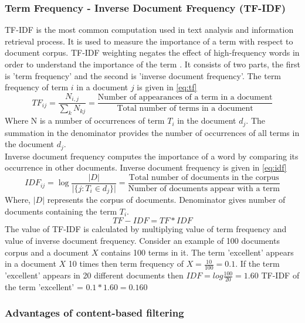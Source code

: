 \subsubsection{Term Frequency - Inverse Document Frequency (TF-IDF)}
TF-IDF is the most common computation used in text analysis and information retrieval process. It is used to measure the importance of a term with respect to document corpus. TF-IDF weighting negates the effect of high-frequency words in order to understand the importance of the term \cite{47}. It consists of two parts, the first is 'term frequency' and the second is 'inverse document frequency'.  The term frequency of term $i$ in a document $j$ is given in \autoref{eq:tf}
\begin{equation}
TF_{ij} = \frac{N_{i,j}}{\sum_{k} N_{kj}} = \frac{\textrm{Number of appearances of a term in a document}}{\textrm{Total number of terms in a document}}
\label{eq:tf}
\end{equation}
\noindent Where N is a number of occurrences of term $T_{i}$ in the document $d_j$. The summation in the denominator provides the number of occurrences of all terms in the document $d_j$. 
\\
\noindent Inverse document frequency computes the importance of a word by comparing its occurrence in other documents. Inverse document frequency is given in \autoref{eq:idf} 
\begin{equation}
IDF_{ij} =\log  \frac{\vert D \vert}{\vert\{j:T_i \in d_j \}  \vert} = \frac{\textrm{Total number of documents in the corpus}}{\textrm{Number of documents appear with a term}}
\label{eq:idf}
\end{equation}
\noindent Where, $\vert D \vert$ represents the corpus of documents. Denominator gives number of documents containing the term $T_i$.
\\
\begin{equation}
TF-IDF = TF * IDF
\label{eq:tfidf}
\end{equation}
\noindent The value of TF-IDF is calculated by multiplying value of term frequency and value of inverse document frequency. Consider an example of 100 documents corpus and a document $X$ contains 100 terms in it. The term 'excellent' appears in a document $X$ 10 times then term frequency of $X = \frac{10}{100} = 0.1$. If the term 'excellent' appears in 20 different documents then $IDF  = log\frac{100}{20} = 1.60 $ TF-IDF of the term 'excellent' = $0.1 * 1.60 = 0.160 $


\subsubsection{Advantages of content-based filtering}

